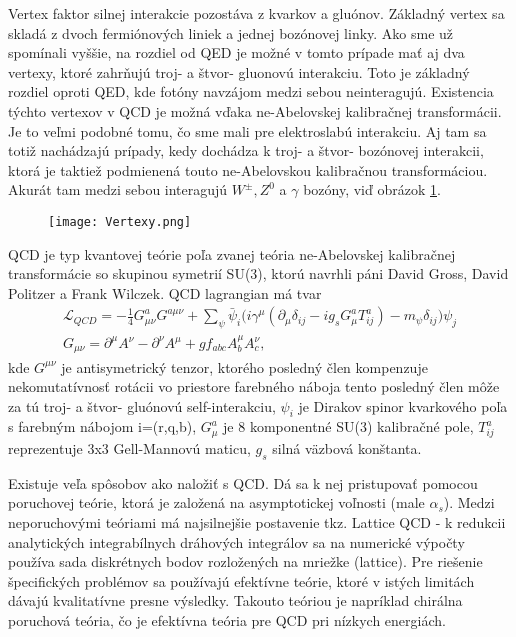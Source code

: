 \documentclass[../../main.tex]{subfiles}
\begin{document}
Vertex faktor silnej interakcie pozostáva z kvarkov a gluónov. Základný vertex sa skladá z dvoch fermiónových liniek a jednej bozónovej linky. Ako sme už spomínali vyššie, na rozdiel od QED je možné v tomto prípade mať aj dva vertexy, ktoré zahrňujú troj- a štvor- gluonovú interakciu. Toto je základný rozdiel oproti QED, kde fotóny navzájom medzi sebou neinteragujú. Existencia týchto vertexov v QCD je možná vďaka ne-Abelovskej kalibračnej transformácii. Je to veľmi podobné tomu, čo sme mali pre elektroslabú interakciu. Aj tam sa totiž nachádzajú prípady, kedy dochádza k troj- a štvor- bozónovej interakcii, ktorá je taktiež podmienená touto ne-Abelovskou kalibračnou transformáciou. Akurát tam medzi sebou interagujú $W^{\pm}, Z^0$ a $ \gamma$ bozóny, viď obrázok \ref{sf1:ref:vertexy}.
\begin{figure}[!h]
\centering
\texttt{[image: Vertexy.png]}
\caption{}
\label{sf1:ref:vertexy}
\end{figure}
\newline

QCD je typ kvantovej teórie poľa zvanej teória ne-Abelovskej kalibračnej transformácie so skupinou symetrií SU(3), ktorú navrhli páni David Gross, David Politzer a Frank Wilczek. QCD lagrangian má tvar
\begin{equation}
\begin{gathered}
\mathcal{L}_{QCD}=-\frac{1}{4}G^a_{\mu\nu}G^{a\mu\nu}+
\sum_{\psi}\bar{\psi}_i\big(i\gamma^{\mu}(\partial_{\mu}\delta_{ij}-ig_sG_{\mu}^aT_{ij}^a)-m_{\psi}\delta_{ij}\big)\psi_j\\
G_{\mu\nu}=\partial^{\mu}A^{\nu}-\partial^{\nu}A^{\mu}+gf_{abc}A^{\mu}_bA_c^{\nu},
\end{gathered}
\end{equation}
kde $G^{\mu\nu}$ je antisymetrický tenzor, ktorého posledný člen kompenzuje nekomutatívnosť rotácii vo priestore farebného náboja tento posledný člen môže za tú troj- a štvor- gluónovú self-interakciu, $\psi_i$ je Dirakov spinor kvarkového poľa s farebným nábojom i=(r,q,b), $G_{\mu}^a$ je 8 komponentné SU(3) kalibračné pole, $T_{ij}^a$ reprezentuje 3x3 Gell-Mannovú maticu, $g_s$ silná väzbová konštanta.

Existuje veľa spôsobov ako naložiť s QCD. Dá sa k nej pristupovať pomocou poruchovej teórie, ktorá je založená na asymptotickej voľnosti (male $\alpha_s$). Medzi neporuchovými teóriami má najsilnejšie postavenie tkz. Lattice QCD - k redukcii analytických integrabílnych dráhových integrálov sa na numerické výpočty používa sada diskrétnych bodov rozložených na mriežke (lattice). Pre riešenie špecifických problémov sa používajú efektívne teórie, ktoré v istých limitách dávajú kvalitatívne presne výsledky. Takouto teóriou je napríklad chirálna poruchová teória, čo je efektívna teória pre QCD pri nízkych energiách.
\end{document}

